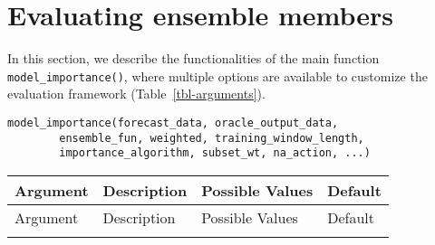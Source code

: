 \documentclass[
  article,
  shortnames,
  notitle]{jss}
\begin{document}
\section{Evaluating ensemble members}\label{evaluating-ensemble-members}

In this section, we describe the functionalities of the main function
\texttt{model\_importance()}, where multiple options are available to
customize the evaluation framework (Table~\ref{tbl-arguments}).

\begin{verbatim}
model_importance(forecast_data, oracle_output_data, 
        ensemble_fun, weighted, training_window_length,
        importance_algorithm, subset_wt, na_action, ...)
\end{verbatim}

\begin{longtable}[]{@{}
  >{\raggedright\arraybackslash}p{}
  >{\raggedright\arraybackslash}p{}
  >{\raggedright\arraybackslash}p{}
  >{\raggedright\arraybackslash}p{}@{}}
\toprule\noalign{}
\begin{minipage}[b]{\linewidth}\raggedright
Argument
\end{minipage} & \begin{minipage}[b]{\linewidth}\raggedright
Description
\end{minipage} & \begin{minipage}[b]{\linewidth}\raggedright
Possible Values
\end{minipage} & \begin{minipage}[b]{\linewidth}\raggedright
Default
\end{minipage} \\
\midrule\noalign{}
\endfirsthead
\toprule\noalign{}
\begin{minipage}[b]{\linewidth}\raggedright
Argument
\end{minipage} & \begin{minipage}[b]{\linewidth}\raggedright
Description
\end{minipage} & \begin{minipage}[b]{\linewidth}\raggedright
Possible Values
\end{minipage} & \begin{minipage}[b]{\linewidth}\raggedright
Default
\end{minipage} \\
\midrule\noalign{}

\end{longtable}
\end{document}
